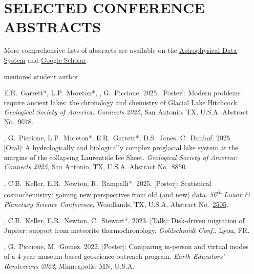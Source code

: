 \section{SELECTED CONFERENCE ABSTRACTS}

More comprehensive lists of abstracts are available on the \href{https://ui.adsabs.harvard.edu/search/q=author%3A%22Edwards%2C%20Graham%20Harper%22}{Astrophysical Data System} and \href{https://scholar.google.com/citations?user=KHLOvgcAAAAJ&hl=en}{Google Scholar}.

\hfill* mentored student author

\begin{etaremune} [itemsep=4pt, leftmargin=3ex]
  
  \item E.R.~Garrett*, L.P.~Moreton*, \ghedwards, G.~Piccione. 2025. [Poster]: Modern problems require ancient lakes: the chronology and chemistry of Glacial Lake Hitchcock. \textit{Geological Society of America: Connects 2025}, San Antonio, TX, U.S.A. Abstract No.~9078.
  
  \item \ghedwards, G.~Piccione, L.P.~Moreton*, E.R.~Garrett*, D.S.~Jones, C.~Danhof. 2025. [Oral]: A hydrologically and biologically complex proglacial lake system at the margins of the collapsing Laurentide Ice Sheet. \textit{Geological Society of America: Connects 2025}, San Antonio, TX, U.S.A. Abstract No.~\href{https://gsameetings.secure-platform.com/connects25/solicitations/103002/sessiongallery/schedule/items/95040/application/8850}{8850}.

  \item \ghedwards, C.B.~Keller, E.R.~Newton, R.~Rampalli*. 2025. [Poster]: Statistical cosmochemistry: gaining new perspectives from old (and new) data. \textit{56\textsuperscript{th} Lunar \& Planetary Science Conference}, Woodlands, TX, U.S.A. Abstract No.~\href{https://www.hou.usra.edu/meetings/lpsc2025/pdf/2505.pdf}{2505}.

  \item \ghedwards, C.B.~Keller, E.R.~Newton, C.~Stewart*. 2023. [Talk]: Disk-driven migration of Jupiter: support from meteorite thermochronology. \textit{Goldschmidt Conf.}, Lyon, FR. 

  \item \ghedwards, G.~Piccione, M.~Gomez. 2022. [Poster]: Comparing in-person and virtual modes of a 4-year museum-based geoscience outreach program. \textit{Earth Educators' Rendezvous 2022}, Minneapolis, MN, U.S.A.


\end{etaremune}
